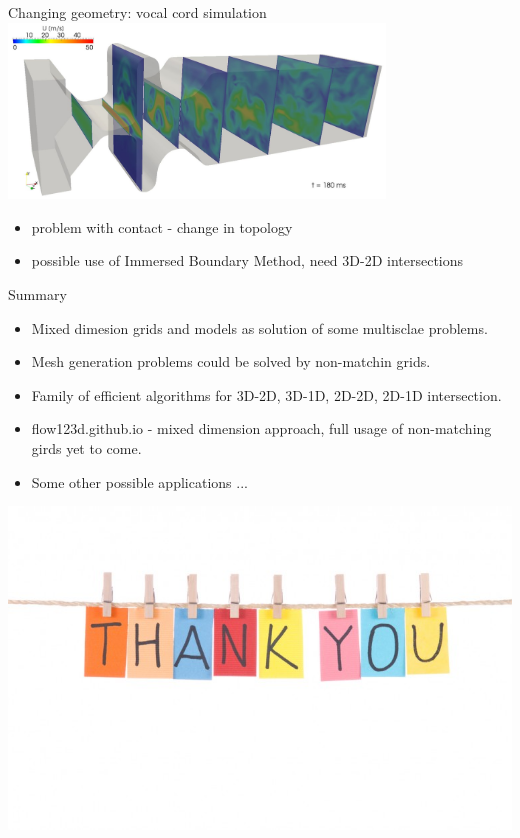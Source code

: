 \documentclass[10pt]{beamer} %
\begin{document}
\begin{frame}{Changing geometry: vocal cord simulation}
\includegraphics[width=10cm]{graphics/vocal_tract.png}

\begin{itemize}
 \item problem with contact - change in topology
 \item possible use of Immersed Boundary Method, need 3D-2D intersections
\end{itemize}
\end{frame}


\begin{frame}{Summary}
\begin{itemize}
 \item Mixed dimesion grids and models as solution of some multisclae problems.
 \item Mesh generation problems could be solved by non-matchin grids.
 \item Family of efficient algorithms for 3D-2D, 3D-1D, 2D-2D, 2D-1D intersection.
 \item flow123d.github.io - mixed dimension approach, full usage of non-matching girds yet to come.
 \item Some other possible applications ...
\end{itemize}

\pause

\vspace{2ex}
\begin{center}
\includegraphics[scale=0.3]{graphics/thank-you-clothesline-752x483.jpg}
\end{center}


\end{frame}
\end{document}
